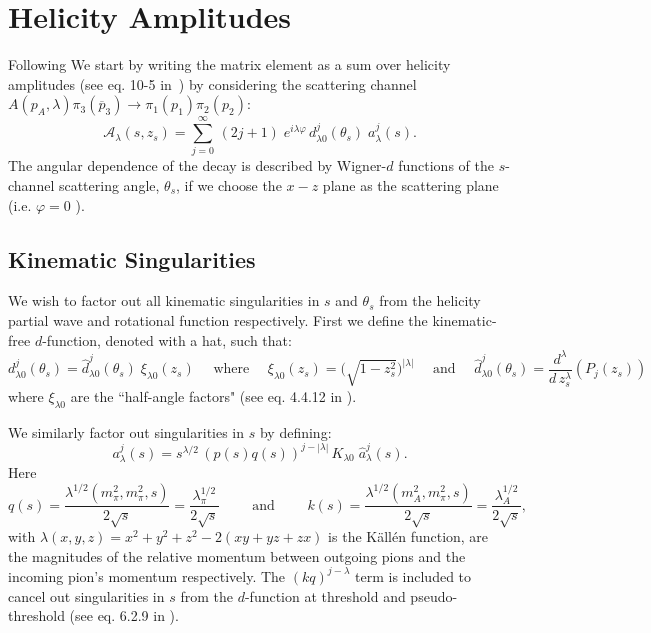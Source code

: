 \documentclass[10pt, aps,prd,amsmath,amssymb,superscriptaddress,onecolumn,
nofootinbib,showpacs,preprintnumbers]{revtex4-1}
\begin{document}
\section{Helicity Amplitudes}
Following \cite{Mikhasenko:2017rkh} We start by writing the matrix element as a sum over helicity amplitudes (see eq. 10-5 in~\cite{perl}) by considering the scattering channel \(A(p_A, \lambda) \pi_3(\overline{p}_3) \to  \pi_1(p_1)\pi_2(p_2)\):
  \begin{equation}
    \label{eq:helicity}
    \mathcal{A}_\lambda(s,z_s) = \sum_{j= 0}^\infty \, (2j +1) \; e^{i\lambda\varphi} \, d_{\lambda0}^j(\theta_s) \; a_\lambda^j(s).
  \end{equation}
The angular dependence of the decay is described by Wigner-\(d\) functions of the \(s\)-channel scattering angle, \(\theta_s\), if we choose the \(x-z\) plane as the scattering plane (i.e. \(\varphi = 0 \) ).
\subsection{Kinematic Singularities}
\label{sec:kin-singularities}
We wish to factor out all kinematic singularities in \(s\) and \(\theta_s\) from the helicity partial wave and rotational function respectively. First we define the kinematic-free \(d\)-function, denoted with a hat, such that:
  \begin{equation}
      \label{eq:halfangle}
      d^j_{\lambda 0}(\theta_s) = \hat{d}^j_{\lambda 0}(\theta_s) \; \xi_{\lambda 0}(z_s)
       \quad \text{ where } \quad
      \xi_{\lambda 0}(z_s) = \bigg( \sqrt{ 1- z_s^2} \bigg)^{|\lambda|}
       \quad \text{ and } \quad
      \hat{d}^j_{\lambda 0}(\theta_s) = \frac{d^\lambda}{d \, z_s^\lambda} (P_j(z_s))
  \end{equation}
where \(\xi_{\lambda 0}\) are the ``half-angle factors" (see eq. 4.4.12 in \cite{Collins}).

We similarly factor out singularities in \(s\) by defining:
  \begin{equation}
    \label{eq:kinematicfreepartialwave}
    a^j_\lambda(s) = s^{\lambda/2} \, (p(s)q(s))^{j - |\lambda|} \, K_{\lambda 0} \; \hat{a}^j_\lambda(s).
  \end{equation}
Here
  \begin{equation}
    \label{eq:momenta}
    q(s) = \frac{\lambda^{1/2}(m_\pi^2, m_\pi^2, s)}{2\sqrt{s}} = \frac{\lambda_\pi^{1/2}}{2\sqrt{s}} \qquad \text{ and } \qquad k(s) = \frac{\lambda^{1/2}(m_A^2, m_\pi^2, s)}{2\sqrt{s}} = \frac{\lambda_A^{1/2}}{2\sqrt{s}} ,
  \end{equation}
with \(\lambda(x,y,z) = x^2 + y^2 + z^2 - 2 (xy + yz + zx)\) is the K\"{a}ll\'{e}n function, are the magnitudes of  the relative momentum between outgoing pions and the incoming pion's momentum respectively. The \((kq)^{j-\lambda}\) term is included to cancel out singularities in \(s\) from the \(d\)-function at threshold and pseudo-threshold (see eq. 6.2.9 in \cite{Collins}).
\end{document}
